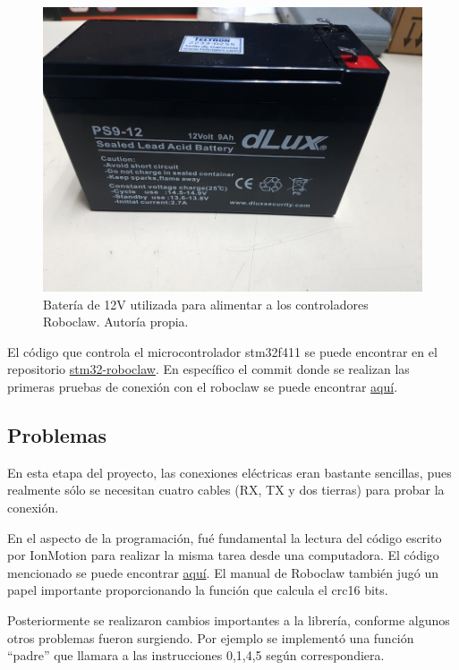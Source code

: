 \begin{figure}[h!]
\centering
\includegraphics[scale=0.4]{imagenes/bateria.jpg}
\caption{Batería de 12V utilizada para alimentar a los controladores Roboclaw. Autoría propia.}
\label{F:bateria}
\end{figure}

El código que controla el microcontrolador stm32f411 se puede encontrar en el repositorio \href{https://github.com/arcoslab/stm32-roboclaw/}{stm32-roboclaw}. En específico el commit donde se realizan las primeras pruebas de conexión con el roboclaw se puede encontrar \href{https://github.com/arcoslab/stm32-roboclaw/commit/a6550243ac7c911bdcf5b3bf379690d89427ade5}{aquí}.

\subsection{Problemas}

En esta etapa del proyecto, las conexiones eléctricas eran bastante sencillas, pues realmente sólo se necesitan cuatro cables (RX, TX y dos tierras) para probar la conexión.

En el aspecto de la programación, fué fundamental la lectura del código escrito por IonMotion para realizar la misma tarea desde una computadora. El código mencionado se puede encontrar \href{http://www.basicmicro.com/downloads}{aquí}. El manual de Roboclaw también jugó un papel importante proporcionando la función que calcula el crc16 bits.

Posteriormente se realizaron cambios importantes a la librería, conforme algunos otros problemas fueron surgiendo. Por ejemplo se implementó una función ``padre'' que llamara a las instrucciones 0,1,4,5 según correspondiera.

